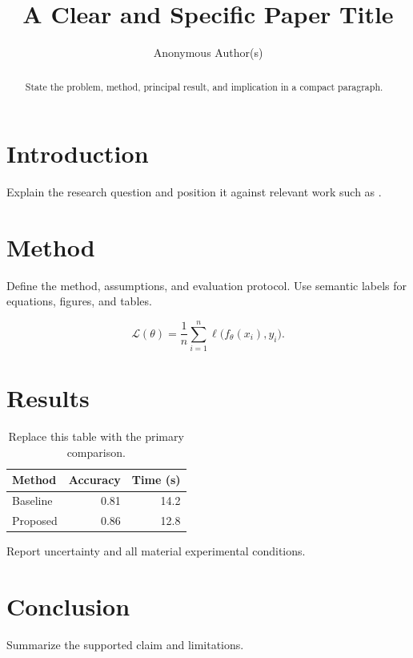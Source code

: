 \documentclass[sigconf,review,anonymous]{acmart}
\title{A Clear and Specific Paper Title}
\author{Anonymous Author(s)}
\affiliation{%
  \institution{Anonymous Institution}
  \country{Anonymous}
}
\begin{document}
\begin{abstract}
State the problem, method, principal result, and implication in a compact
paragraph.
\end{abstract}


\maketitle

\section{Introduction}
\label{sec:introduction}

Explain the research question and position it against relevant work such as
\cite{lamport1994latex}.

\section{Method}
\label{sec:method}

Define the method, assumptions, and evaluation protocol. Use semantic labels
for equations, figures, and tables.

\begin{equation}
  \label{eq:objective}
  \mathcal{L}(\theta) = \frac{1}{n}\sum_{i=1}^{n}
  \ell\bigl(f_{\theta}(x_i), y_i\bigr).
\end{equation}

\section{Results}
\label{sec:results}

\begin{table}[t]
  \centering
  \caption{Replace this table with the primary comparison.}
  \label{tab:results}
  \begin{tabular}{lrr}
    \toprule
    Method & Accuracy & Time (s) \\
    \midrule
    Baseline & 0.81 & 14.2 \\
    Proposed & 0.86 & 12.8 \\
    \bottomrule
  \end{tabular}
\end{table}

Report uncertainty and all material experimental conditions.

\section{Conclusion}

Summarize the supported claim and limitations.



\end{document}
